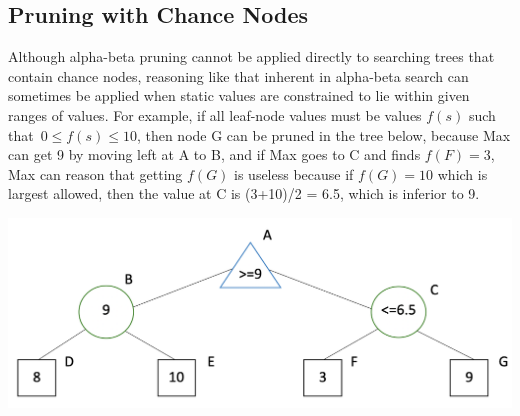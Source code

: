 \documentclass[12pt]{article}
\begin{document}
\subsection{Pruning with Chance Nodes}

Although alpha-beta pruning cannot be applied directly to searching trees that contain chance nodes, reasoning like that inherent in alpha-beta search can sometimes be applied when static values are constrained to lie within given ranges of values.
For example, if all leaf-node values must be values $f(s)$ such that\
$ 0 \le f(s) \le 10$, then node G can be pruned in the tree below,
because Max can get 9 by moving left at A to B, and
if Max goes to C and finds $f(F)=3$, Max can reason that getting $f(G)$ is
useless because if $f(G)=10$ which is largest allowed, then the value at C is (3+10)/2 = 6.5, which is inferior to 9.

\begin{center}
  \includegraphics[width=6in]{q3-Expectimax-Pruning-Example.png}
\end{center}
\end{document}
